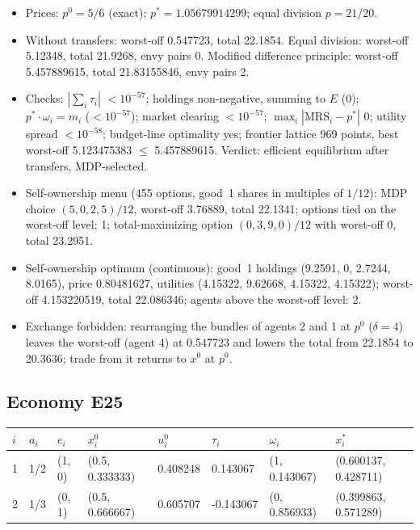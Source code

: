 \begin{itemize}[leftmargin=1.2em,itemsep=0pt,topsep=2pt]\footnotesize
\item Prices: $p^0 = 5/6$ (exact); $p^* = 1.05679914299$; equal division $p = 21/20$.
\item Without transfers: worst-off 0.547723, total 22.1854. Equal division: worst-off 5.12348, total 21.9268, envy pairs 0. Modified difference principle: worst-off 5.457889615, total 21.83155846, envy pairs 2.
\item Checks: $|\sum_i\tau_i|$ $<10^{-57}$; holdings non-negative, summing to $E$ (0); $p^*\cdot\omega_i = m_i$ ($<10^{-57}$); market clearing $<10^{-57}$; $\max_i|\mathrm{MRS}_i - p^*|$ 0; utility spread $<10^{-58}$; budget-line optimality yes; frontier lattice 969 points, best worst-off 5.123475383 $\leq$ 5.457889615. Verdict: efficient equilibrium after transfers, MDP-selected.
\item Self-ownership menu (455 options, good~1 shares in multiples of $1/12$): MDP choice $(5, 0, 2, 5)/12$, worst-off 3.76889, total 22.1341; options tied on the worst-off level: 1; total-maximizing option $(0, 3, 9, 0)/12$ with worst-off 0, total 23.2951.
\item Self-ownership optimum (continuous): good~1 holdings (9.2591, 0, 2.7244, 8.0165), price 0.80481627, utilities (4.15322, 9.62668, 4.15322, 4.15322); worst-off 4.153220519, total 22.086346; agents above the worst-off level: 2.
\item Exchange forbidden: rearranging the bundles of agents 2 and 1 at $p^0$ ($\delta = 4$) leaves the worst-off (agent 4) at 0.547723 and lowers the total from 22.1854 to 20.3636; trade from it returns to $x^0$ at $p^0$.
\end{itemize}

\subsection*{Economy E25}
\label{ec:E25}
{\scriptsize\setlength{\tabcolsep}{3pt}
\begin{tabular}{@{}llllllll@{}}
\toprule
$i$ & $a_i$ & $e_i$ & $x^0_i$ & $u^0_i$ & $\tau_i$ & $\omega_i$ & $x^*_i$ \\
\midrule
1 & 1/2 & (1, 0) & (0.5, 0.333333) & 0.408248 & 0.143067 & (1, 0.143067) & (0.600137, 0.428711) \\
2 & 1/3 & (0, 1) & (0.5, 0.666667) & 0.605707 & -0.143067 & (0, 0.856933) & (0.399863, 0.571289) \\
\bottomrule\end{tabular}}

